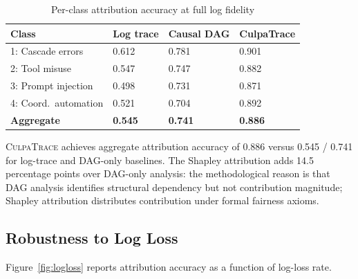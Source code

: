 \documentclass[sigconf,nonacm]{acmart}
\begin{document}
\begin{table}[h]
\caption{Per-class attribution accuracy at full log fidelity}
\label{tab:perclass}
\small
\begin{tabularx}{\columnwidth}{@{}p{2.6cm}X X X@{}}
\toprule
\textbf{Class} & \textbf{Log trace} & \textbf{Causal DAG} & \textbf{CulpaTrace} \\
\midrule
1: Cascade errors    & 0.612 & 0.781 & 0.901 \\
2: Tool misuse       & 0.547 & 0.747 & 0.882 \\
3: Prompt injection  & 0.498 & 0.731 & 0.871 \\
4: Coord.\ automation & 0.521 & 0.704 & 0.892 \\
\midrule
\textbf{Aggregate}   & \textbf{0.545} & \textbf{0.741} & \textbf{0.886} \\
\bottomrule
\end{tabularx}
\end{table}

\textsc{CulpaTrace} achieves aggregate attribution accuracy of
0.886 versus 0.545 / 0.741 for log-trace and DAG-only baselines.
The Shapley attribution adds 14.5 percentage points over
DAG-only analysis: the methodological reason is that DAG analysis
identifies structural dependency but not contribution magnitude;
Shapley attribution distributes contribution under formal
fairness axioms.

\subsection{Robustness to Log Loss}

Figure~\ref{fig:logloss} reports attribution accuracy as a function
of log-loss rate.
\end{document}
